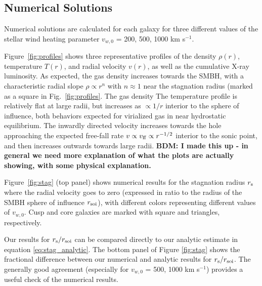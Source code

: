 \documentclass[usenatbib,fleqn]{mn2e}
\begin{document}

\subsection{Numerical Solutions}

Numerical solutions are calculated for each galaxy for three different values of the stellar wind heating parameter $v_{w,0}$ = 200, 500, 1000 km s$^{-1}$.  

Figure~\ref{fig:profiles} shows three representative profiles of the
density $\rho(r)$, temperature $T(r)$, and radial velocity $v(r)$, as
well as the cumulative X-ray luminosity.  As expected, the gas density
increases towards the SMBH, with a characteristic radial slope $\rho
\propto r^{n}$ with $n \approx 1$ near the stagnation radius (marked
as a square in Fig.~\ref{fig:profiles}. The gas density The
temperature profile is relatively flat at large radii, but increases
as $\propto 1/r$ interior to the sphere of influence, both behaviors
expected for virialized gas in near hydrostatic equilibrium.  The
inwardly directed velocity increases towards the hole approaching the
expected free-fall rate $v \propto v_{\rm ff}\propto r^{-1/2}$
interior to the sonic point, and then increases outwards towards large
radii. {\bf BDM: I made this up - in general we need more explanation
  of what the plots are actually showing, with some physical
  explanation.}

Figure~\ref{fig:stag} (top panel) shows numerical results for the
stagnation radius $r_{\rm s}$ where the radial velocity goes to zero
(expressed in ratio to the radius of the SMBH sphere of influence
$r_{\rm soi}$), with different colors representing different values of
$v_{w,0}$.  Cusp and core galaxies are marked with square and
triangles, respectively.  

Our results for $r_{\rm s}/r_{\rm soi}$ can be compared directly to our analytic estimate in equation \ref{eq:stag_analytic}.  The bottom panel of Figure \ref{fig:stag} shows the fractional difference between our numerical and analytic results for $r_{\rm s}/r_{\rm soi}$.  The generally good agreement (especially for $v_{w,0}$ = 500, 1000 km s$^{-1}$) provides a useful check of the numerical results.
\end{document}

